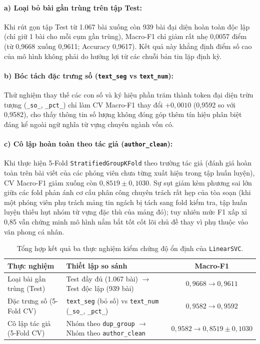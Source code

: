 \paragraph{a) Loại bỏ bài gần trùng trên tập Test:}
Khi rút gọn tập Test từ 1.067 bài xuống còn 939 bài đại diện hoàn toàn độc lập (chỉ giữ 1 bài cho mỗi cụm gần trùng), Macro-F1 chỉ giảm rất nhẹ 0,0057 điểm (từ 0,9668 xuống 0,9611; Accuracy 0,9617). Kết quả này khẳng định điểm số cao của mô hình không phải do hưởng lợi từ các chuỗi bản tin lặp định kỳ.

\paragraph{b) Bóc tách đặc trưng số (\texttt{text\_seg} vs \texttt{text\_num}):}
Thử nghiệm thay thế các con số và ký hiệu phần trăm thành token đại diện trừu tượng (\texttt{\_so\_}, \texttt{\_pct\_}) chỉ làm CV Macro-F1 thay đổi $+0,0010$ (0,9592 so với 0,9582), cho thấy thông tin số lượng không đóng góp thêm tín hiệu phân biệt đáng kể ngoài ngữ nghĩa từ vựng chuyên ngành vốn có.

\paragraph{c) Cô lập hoàn toàn theo tác giả (\texttt{author\_clean}):}
Khi thực hiện 5-Fold \texttt{StratifiedGroupKFold} theo trường tác giả (đánh giá hoàn toàn trên bài viết của các phóng viên chưa từng xuất hiện trong tập huấn luyện), CV Macro-F1 giảm xuống còn $0,8519 \pm 0,1030$. Sự sụt giảm kèm phương sai lớn giữa các fold phản ánh cơ cấu phân công chuyên trách rất hẹp của tòa soạn (khi một phóng viên phụ trách mảng tin ngách bị tách sang fold kiểm tra, tập huấn luyện thiếu hụt nhóm từ vựng đặc thù của mảng đó); tuy nhiên mức F1 xấp xỉ 0,85 vẫn chứng minh mô hình nắm bắt tốt cốt lõi chủ đề thay vì phụ thuộc vào văn phong cá nhân.

\begin{table}[H]
  \centering
  \caption{Tổng hợp kết quả ba thực nghiệm kiểm chứng độ ổn định của \texttt{LinearSVC}.}
  \label{tab:text_robustness}
  \begin{tabularx}{\linewidth}{l X c}
    \toprule
    \textbf{Thực nghiệm} & \textbf{Thiết lập so sánh} & \textbf{Macro-F1} \\
    \midrule
    Loại bài gần trùng (Test) & Test đầy đủ (1.067 bài) $\rightarrow$ Test độc lập (939 bài) & $0,9668 \rightarrow 0,9611$ \\
    Đặc trưng số (5-Fold CV) & \texttt{text\_seg} (bỏ số) vs \texttt{text\_num} (\texttt{\_so\_}, \texttt{\_pct\_}) & $0,9582 \rightarrow 0,9592$ \\
    Cô lập tác giả (5-Fold CV) & Nhóm theo \texttt{dup\_group} $\rightarrow$ Nhóm theo \texttt{author\_clean} & $0,9582 \rightarrow 0,8519 \pm 0,1030$ \\
    \bottomrule
  \end{tabularx}
\end{table}

